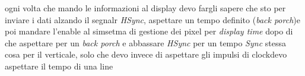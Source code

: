 ogni volta che mando le informazioni al display devo fargli sapere che sto per inviare i dati alzando il segnalr \textit{HSync}, aspettare un tempo definito (\textit{back porch})e poi mandare l'enable al simsetma di gestione dei pixel per \textit{display time} dopo di che aspettare per un \textit{back porch} e abbassare \textit{HSync} per un tempo \textit{Sync}
stessa cosa per il verticale, solo che devo invece di aspettare gli impulsi di clockdevo aspettare il tempo di una line